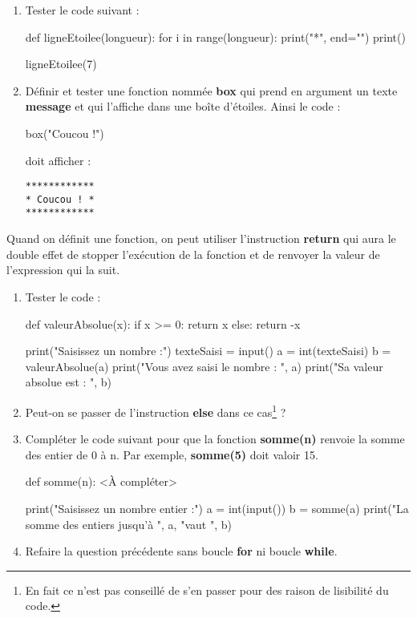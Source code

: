 \documentclass[a4paper,11pt,DIV18,BCOR0mm]{scrartcl}
\begin{document}
\begin{exercice}
\begin{enumerate}
  \item Tester le code suivant :
\begin{python}
def ligneEtoilee(longueur):
    for i in range(longueur):
        print("*", end="")
    print()
    
ligneEtoilee(7)
\end{python}
\item Définir et tester une fonction nommée \textbf{box} qui prend
en argument un texte \textbf{message} et qui 
l'affiche dans une boîte d'étoiles. Ainsi le code :
\begin{python}
box("Coucou !")
\end{python}
doit afficher :
\begin{verbatim}
************
* Coucou ! *
************
\end{verbatim}
\end{enumerate}
\end{exercice}

\begin{exercice}
Quand on définit une fonction, on peut utiliser l'instruction
\textbf{return} qui aura le double effet de stopper l'exécution de la fonction
et de renvoyer la valeur de l'expression qui la suit.
\begin{enumerate}
  \item Tester le code :
  \begin{python}
def valeurAbsolue(x):
  if x >= 0:
      return x
  else:
      return -x

print("Saisissez un nombre :")
texteSaisi = input()
a = int(texteSaisi)
b = valeurAbsolue(a)
print("Vous avez saisi le nombre : ", a)
print("Sa valeur absolue est : ", b)
  \end{python}
  \item Peut-on se passer de l'instruction \textbf{else}
  dans ce cas\footnote{En fait ce n'est pas conseillé de s'en passer pour des
  raison de lisibilité du code.} ?
  \item Compléter le code suivant pour que la fonction
  \textbf{somme(n)} renvoie la somme des entier de 0 à n.
  Par exemple, \textbf{somme(5)} doit valoir 15.
\begin{python}
def somme(n):
    <À compléter>

print("Saisissez un nombre entier :")
a = int(input())
b = somme(a)
print("La somme des entiers jusqu'à ", a, "vaut ", b)
\end{python}
  \item Refaire la question précédente sans boucle \textbf{for}
  ni boucle \textbf{while}.
\end{enumerate}
\end{exercice}
\end{document}
